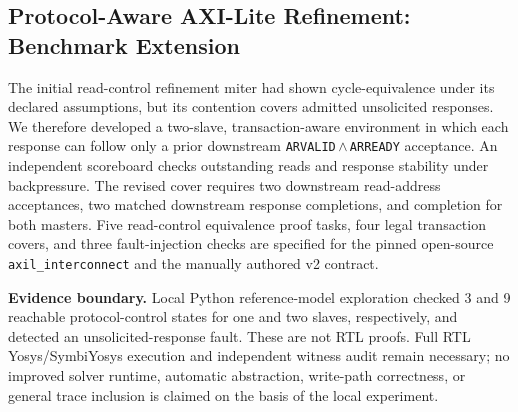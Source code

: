 \subsection{Protocol-Aware AXI-Lite Refinement: Benchmark Extension}
The initial read-control refinement miter had shown cycle-equivalence under
its declared assumptions, but its contention covers admitted unsolicited
responses. We therefore developed a two-slave, transaction-aware environment
in which each response can follow only a prior downstream
\texttt{ARVALID}\,$\land$\,\texttt{ARREADY} acceptance. An independent
scoreboard checks outstanding reads and response stability under backpressure.
The revised cover requires two downstream read-address acceptances, two
matched downstream response completions, and completion for both masters.
Five read-control equivalence proof tasks, four legal transaction covers,
and three fault-injection checks are specified for the pinned open-source
\texttt{axil\_interconnect} and the manually authored v2 contract.

\textbf{Evidence boundary.} Local Python reference-model exploration checked
3 and 9 reachable protocol-control states for one and two slaves, respectively,
and detected an unsolicited-response fault. These are not RTL proofs. Full RTL
Yosys/SymbiYosys execution and independent witness audit remain necessary;
no improved solver runtime, automatic abstraction, write-path correctness, or
general trace inclusion is claimed on the basis of the local experiment.
